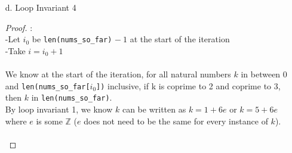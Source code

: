 \documentclass[fontsize=11pt]{article}
\newcommand{\Z}{\mathbb{Z}}
\begin{document}
\begin{enumerate}
\begin{enumerate}
\begin{proof}
We know \texttt{nums\_so\_far[$i_0$]} $<$ \texttt{nums\_so\_far[$i_0 + 1$]} at the start of the iteration. By loop invariant 2, we know the value \texttt{nums\_so\_far[$i_0$]} $+ ~6$ will be appended to the list at index \texttt{nums\_so\_far[$i_0 + 2$]}. So far, we know that \texttt{nums\_so\_far[$i_0$]} $+ ~6$ = \texttt{nums\_so\_far[$i_0 + 2$]}. \\
Seeing as how \texttt{nums\_so\_far} is initially $[1, 5]$, we can deduce that for any two consecutive elements in the list, \texttt{nums\_so\_far[$j + 1$]} - \texttt{nums\_so\_far[$j$]} $\leq 4$. We can deduce this knowing that the difference between 5 and 1 is 4, and we're only adding to previous lists by a constant 6, and that the difference between the constant 6 and the initial difference 4 is 2. Thus consecutive elements will always be increasing, and either have a difference of 4 or 2. \\
From this we can say that \texttt{nums\_so\_far[$i_0$]} $<$ \texttt{nums\_so\_far[$i_0 + 1$]} $\leq$ \texttt{nums\_so\_far[$i_0$]} $+ ~4$ \\
This implies \texttt{nums\_so\_far[$i_0$]} $<$ \texttt{nums\_so\_far[$i_0 + 1$]} $<$ \texttt{nums\_so\_far[$i_0$]} $+ ~6$ \\
Which can be simplified as \texttt{nums\_so\_far[$i_0 + 1$]} $<$ \texttt{nums\_so\_far[$i_0 + 2$]} (by loop invariant 2)\\
Which can be rewritten as \texttt{nums\_so\_far[$i$]} $<$ \texttt{nums\_so\_far[$i + 1$]} \\~\\

Therefore, for all natural numbers $j$ between 0 and \texttt{len(nums\_so\_far)} $- ~2$ inclusive, \texttt{len(nums\_so\_far[$j$])} $<$ \texttt{len(nums\_so\_far[$j + 1$])} (this means that \texttt{nums\_so\_far} is always sorted).
\end{proof}

\item[d.] Loop Invariant 4
\begin{proof}
: \\-Let $i_0$ be \texttt{len(nums\_so\_far)} $- ~1$ at the start of the iteration \\
-Take $i = i_0 + 1$ \\~\\

We know at the start of the iteration, for all natural numbers $k$ in between 0 and \texttt{len(nums\_so\_far[$i_0$])} inclusive, if k is coprime to 2 and coprime to 3, then $k$ in \texttt{len(nums\_so\_far)}. \\
By loop invariant 1, we know $k$ can be written as $k = 1 + 6e$ or $k = 5 + 6e$ where $e$ is some $\Z$ ($e$ does not need to be the same for every instance of $k$). \\~\\


\end{proof}
\end{enumerate}
\end{enumerate}
\end{document}

